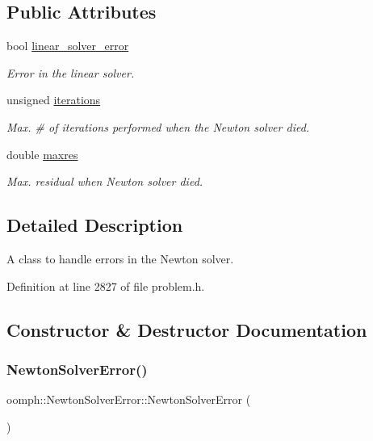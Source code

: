 \subsection*{Public Attributes}
\begin{DoxyCompactItemize}
\item 
bool \hyperlink{classoomph_1_1NewtonSolverError_a30a00b1e2e2baaf733f6197572399875}{linear\+\_\+solver\+\_\+error}
\begin{DoxyCompactList}\small\item\em Error in the linear solver. \end{DoxyCompactList}\item 
unsigned \hyperlink{classoomph_1_1NewtonSolverError_aaae34aeb5b4128c87e03c89de1de60a8}{iterations}
\begin{DoxyCompactList}\small\item\em Max. \# of iterations performed when the Newton solver died. \end{DoxyCompactList}\item 
double \hyperlink{classoomph_1_1NewtonSolverError_ae9ee0ef969c2fbf869afb7c4a75dcbe0}{maxres}
\begin{DoxyCompactList}\small\item\em Max. residual when Newton solver died. \end{DoxyCompactList}\end{DoxyCompactItemize}


\subsection{Detailed Description}
A class to handle errors in the Newton solver. 

Definition at line 2827 of file problem.\+h.



\subsection{Constructor \& Destructor Documentation}
\mbox{\label{classoomph_1_1NewtonSolverError_a9bff481c8bed13d3f3de7f1d50c4d561}} 
\subsubsection{\texorpdfstring{Newton\+Solver\+Error()}{NewtonSolverError()}\hspace{0.1cm}{\footnotesize\ttfamily [1/3]}}
{\footnotesize\ttfamily oomph\+::\+Newton\+Solver\+Error\+::\+Newton\+Solver\+Error (\begin{DoxyParamCaption}{ }\end{DoxyParamCaption})\hspace{0.3cm}{\ttfamily [inline]}}



